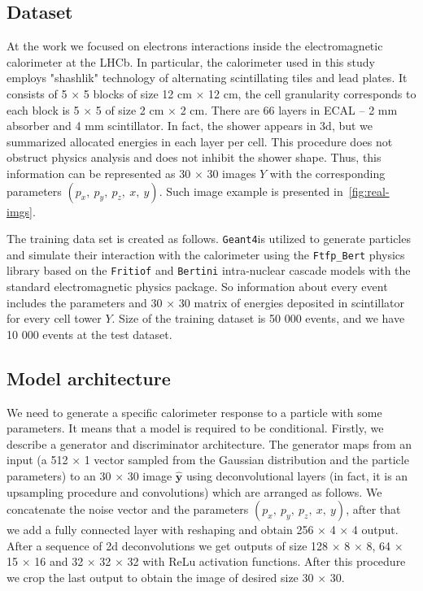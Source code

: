 \documentclass{webofc}
\newcommand{\vx}{\ensuremath{\mathbf{x}}}
\newcommand{\geant}{{\texttt{Geant4}}}
\begin{document}
\subsection{Dataset}
At the work we focused on electrons interactions inside the electromagnetic calorimeter at the LHCb. In particular, the calorimeter used in this study employs "shashlik" technology of alternating scintillating tiles and lead plates. It consists of 5 $\times$ 5 blocks of size 12 cm $\times$ 12 cm, the cell granularity corresponds to each block is 5 $\times$ 5 of size 2 cm $\times$ 2 cm. There are 66 layers in ECAL -- 2 mm absorber and 4 mm scintillator. In fact, the shower appears in 3d, but we summarized allocated energies in each layer per cell. This procedure does not obstruct physics analysis and does not inhibit the shower shape. Thus, this information can be represented as 30 $\times$ 30 images $Y$ with the corresponding parameters $(p_x,~ p_y,~ p_z,~ x,~ y)$. Such image example is presented in~\cref{fig:real-imgs}.

The training data set is created as follows. \geant is utilized to generate particles and simulate their interaction with the calorimeter using the \texttt{Ftfp\_Bert} physics library based on the \texttt{Fritiof}  and \texttt{Bertini} intra-nuclear cascade models with the standard electromagnetic physics package. So information about every event includes the parameters and 30 $\times$ 30 matrix of energies deposited in scintillator for every cell tower $Y$. Size of the training dataset is 50 000 events, and we have 10 000 events at the test dataset.

\subsection{Model architecture}

We need to generate a specific calorimeter response to a particle with some parameters. It means that a model is required to be conditional.
Firstly, we describe a generator and discriminator architecture. The generator maps from an input (a 512 $\times$ 1 vector sampled from the Gaussian distribution and the particle parameters) to an 30 $\times$ 30 image $\hat{\textbf{y}}$ using deconvolutional layers (in fact, it is an upsampling procedure and convolutions) which are arranged as follows. We concatenate the noise vector and the parameters $(p_x,~ p_y,~ p_z,~ x,~ y)$, after that we add a fully connected layer with reshaping and obtain 256 $\times$ 4 $\times$ 4 output. After a sequence of 2d deconvolutions we get outputs of size  128 $\times$ 8 $\times$ 8, 64 $\times$ 15 $\times$ 16 and 32 $\times$ 32 $\times$ 32  with ReLu activation functions. After this procedure we crop the last output to obtain the image of desired size 30 $\times$ 30.
\end{document}
